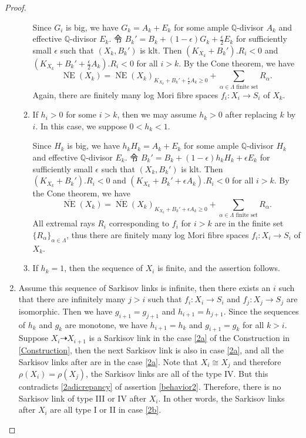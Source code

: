 \begin{proof}
\begin{enumerate}
\begin{enumerate}
                  Since $G_{i}$ is big, we have $G_{k}=A_{k}+E_{k}$ for some ample $\mathbb{Q}$-divisor $A_{k}$ and effective $\mathbb{Q}$-divisor $E_{k}$. 令 $B_{k}'=B_{k}+(1-\epsilon)G_{k}+\frac{\epsilon}{2} E_{k}$ for sufficiently small $\epsilon$ such that $(X_{k},B_{k}')$ is klt. Then $(K_{X_{k}}+B_{k}').R_{i}<0$ and $(K_{X_{k}}+B_{k}'+\frac{\epsilon}{2} A_{k}).R_{i}<0$ for all $i>k$. By the Cone theorem, we have
                  \[
                    \overline{\operatorname{NE}}(X_{k})=\overline{\operatorname{NE}}(X_{k})_{K_{X_{k}}+B_{k}'+\frac{\epsilon}{2}A_{k}\geqslant 0} +\sum_{\alpha \in\Lambda\text{ finite set}}R_{\alpha}.
                  \]
                  Again, there are finitely many log Mori fibre spaces $f_{i}:X_{i}\to S_{i}$ of $X_{k}$.

            \item If $h_i>0$ for some $i>k$, then we may assume $h_k>0$ after replacing $k$ by  $i$. In this case, we suppose $0<h_k<1$.

                  Since $H_{k}$ is big, we have $h_{k}H_{k}=A_{k}+E_{k}$ for some ample $\mathbb{Q}$-divisor $H_{k}$ and effective $\mathbb{Q}$-divisor  $E_{k}$. 令 $B_{k}'=B_{k}+(1-\epsilon)h_{k}H_{k}+\epsilon E_{k}$ for sufficiently small $\epsilon$ such that $(X_{k},B_{k}')$ is klt. Then $(K_{X_{k}}+B_{k}').R_{i}<0$ and $(K_{X_{k}}+B_{k}'+\epsilon A_{k}).R_{i}<0$ for all $i>k$. By the Cone theorem, we have
                  \[
                    \overline{\operatorname{NE}}(X_{k})=\overline{\operatorname{NE}}(X_{k})_{K_{X_{k}}+B_{k}'+\epsilon A_{k}\geqslant 0} +\sum_{\alpha \in\Lambda\text{ finite set}}R_{\alpha}.
                  \]
                  All extremal rays $R_{i}$ corresponding to $f_{i}$ for $i>k$ are in the finite set $\{R_{\alpha}\}_{\alpha \in \Lambda} $, thus there are finitely many log Mori fibre spaces $f_{i}:X_{i}\to S_{i}$ of $X_{k}$.

            \item If $h_k=1$, then the sequence of $X_i$ is finite, and the assertion follows.
          \end{enumerate}
    \item Assume this sequence of Sarkisov links is infinite, then there exists an  $i$ such that there are infinitely many $j>i$ such that $f_{i}:X_{i}\to S_{i}  $ and $f_{j}:X_{j}\to S_{j}$ are isomorphic. Then we have $g_{i+1}=g_{j+1}$ and $h_{i+1}=h_{j+1}$. Since the sequences of $h_{k}$ and $g_{k}$ are monotone, we have $h_{i+1}=h_{k}$ and  $g_{i+1}=g_{k}$ for all $k>i$. Suppose $X_{i}\dashrightarrow X_{i+1}$ is a Sarkisov link in the case \ref{2a} of the Construction in \ref{Construction}, then the next Sarkisov link is also in case \ref{2a}, and all the Sarkisov links after are in the case \ref{2a}. Note that $X_{i}\cong X_{j}$ and therefore $\rho(X_{i})=\rho(X_{j})$, the Sarkisov links are all of the type IV. But this contradicts \ref{2adicrepancy} of assertion \ref{behavior2}. Therefore, there is no Sarkisov link of type III or IV after $X_{i}$. In other words, the Sarkisov links after $X_{i}$ are all type I or II in case \ref{2b}.


\end{enumerate}
\end{proof}
